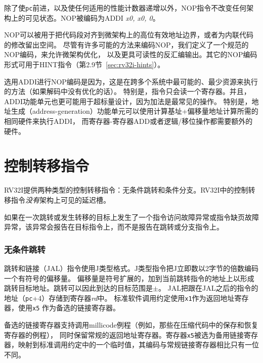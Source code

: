 除了使{\tt pc}前进，以及使任何适用的性能计数器递增以外，NOP指令不改变任何架构上的可见状态。NOP被编码为ADDI {\em x0, x0, 0}。

\begin{commentary}

NOP可以被用于把代码段对齐到微架构上的高位有效地址边界，或者为内联代码的修改留出空间。
尽管有许多可能的方法来编码NOP，我们定义了一个规范的NOP编码，来允许微架构优化，
以及更具可读性的反汇编输出。其它的NOP编码形式可用于HINT指令（第2.9节~\ref{sec:rv32i-hints}）。

选用ADDI进行NOP编码是因为，这是在跨多个系统中最可能的、最少资源来执行的方法（如果解码中没有优化的话）。
特别是，指令只会读一个寄存器。并且，ADDI功能单元也更可能用于超标量设计，因为加法是最常见的操作。
特别是，地址生成（address-generation）功能单元可以使用计算基址+偏移量地址计算所需的相同硬件来执行ADDI，
而寄存器-寄存器ADD或者逻辑/移位操作都需要额外的硬件。
\end{commentary}

\section{控制转移指令}

RV32I提供两种类型的控制转移指令：无条件跳转和条件分支。RV32I中的控制转移指令{\em 没有}架构上可见的延迟槽。

如果在一次跳转或发生转移的目标上发生了一个指令访问故障异常或指令缺页故障异常，该异常会报告在目标指令上，而不是报告在跳转或分支指令上。

\subsubsection*{无条件跳转}

\vspace{-0.1in} 跳转和链接（JAL）指令使用J类型格式。J类型指令把J立即数以2字节的倍数编码一个有符号的偏移量。
偏移量是符号扩展的，加到当前跳转指令的地址上以形成跳转目标地址。跳转可以因此到达的目标范围是$\pm$。
JAL把跟在JAL之后的指令的地址（{\tt pc}+4）存储到寄存器{\em rd}中。
标准软件调用约定使用{\tt x1}作为返回地址寄存器，使用{\tt x5} 作为备选的链接寄存器。

\begin{commentary}

备选的链接寄存器支持调用millicode例程（例如，那些在压缩代码中的保存和恢复寄存器的例程），
同时保留常规的返回地址寄存器。寄存器{\tt x5}被选为备用链接寄存器，映射到标准调用约定中的一个临时值，其编码与常规链接寄存器相比只有一位不同。
\end{commentary}

